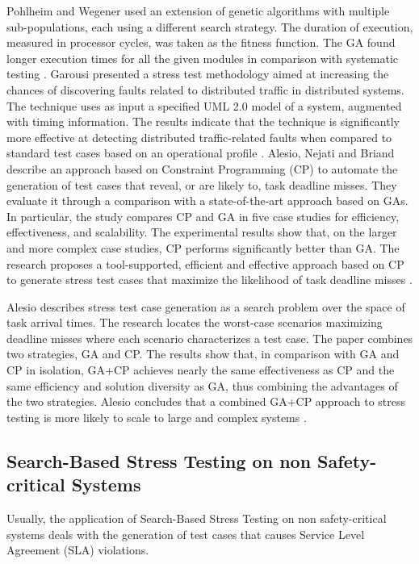 \documentclass[espaco=umemeio,chapter=TITLE,twoside,openright]{abnt}
\begin{document}
Pohlheim and Wegener used an extension of genetic algorithms with multiple sub-populations, each using a different search strategy. The duration of execution, measured in processor cycles, was taken as the fitness
function. The GA found longer execution times for all the given modules in comparison with systematic testing \cite{Pohlheim2005}. Garousi presented a stress test methodology aimed at increasing the chances of discovering faults related to distributed traffic in distributed systems. The technique uses as input a specified UML 2.0 model of a system, augmented with timing information. The results indicate that the technique is significantly more effective at detecting distributed traffic-related faults when compared to standard test cases based on an operational profile \cite{Garousi2006}. Alesio, Nejati and Briand describe an approach based
on Constraint Programming (CP) to automate the generation of test cases that reveal, or are likely to, task deadline misses. They evaluate it through a comparison with a state-of-the-art approach based on GAs. In particular, the study compares CP and GA in five case studies for efficiency, effectiveness, and scalability. The experimental results show that, on the larger and more complex case studies, CP performs significantly better than GA. The research proposes a tool-supported, efficient and effective approach based on CP to generate stress test cases that maximize the likelihood of task deadline misses \cite{DiAlesio2013}.

Alesio describes stress test case generation as a search problem over the space of task arrival times. The research locates the  worst-case scenarios maximizing deadline misses where each scenario characterizes a test case. The paper combines two strategies, GA and CP. The results show that, in comparison with GA and CP in isolation, GA+CP achieves nearly the same effectiveness as CP and the same efficiency and solution diversity as GA, thus combining the advantages of the two strategies. Alesio concludes that a combined GA+CP approach to stress testing is more likely to scale to large and complex systems \cite{Alesio2015}.

\subsection{Search-Based Stress Testing on non Safety-critical Systems}

Usually, the application of Search-Based Stress Testing on non safety-critical systems deals with the generation of test cases that causes Service Level Agreement (SLA) violations.
\end{document}
